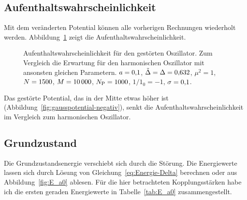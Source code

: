 \subsection{Aufenthaltswahrscheinlichkeit}

Mit dem veränderten Potential können alle vorherigen Rechnungen wiederholt
werden. Abbildung~\ref{fig:histogram_gauss} zeigt die
Aufenthaltswahrscheinlichkeit.

\begin{figure}[htbp]
    \centering
    \caption{%
        Aufenthaltswahrscheinlichkeit für den gestörten Oszillator. Zum
        Vergleich die Erwartung für den harmonischen Oszillator mit ansonsten
        gleichen Parametern. $a = \num{0.1}$, $\tilde \Delta =
        \Delta = \num{0.632}$, $\mu^2 = \num{1}$, $N = \num{1500}$,
        $M = \num{10000}$, $N_\text P = \num{1000}$, $1/1_0 =
        \num{-1}$, $\sigma = \num{0.1}$.
    }
    \label{fig:histogram_gauss}
\end{figure}

Das gestörte Potential, das in der Mitte etwas höher ist
(Abbildung~\ref{fig:gausspotential-negativ}), senkt die
Aufenthaltswahrscheinlichkeit im Vergleich zum harmonischen Oszillator.

\subsection{Grundzustand}

Die Grundzustandsenergie verschiebt sich durch die Störung. Die Energiewerte
lassen sich durch Lösung von Gleichung~\eqref{eq:Energie-Delta} berechnen oder
aus Abbildung~\ref{fig:E_a0} ablesen. Für die hier betrachteten
Kopplungsstärken habe ich die ersten geraden Energiewerte in
Tabelle~\ref{tab:E_a0} zusammengestellt.

